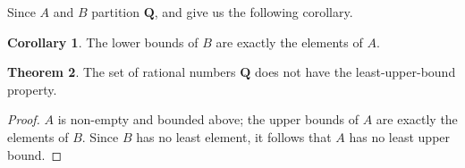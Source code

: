 \documentclass[12pt]{article}
\theoremstyle{definition}
\newtheorem{theorem}{Theorem}
\newtheorem{corollary}[theorem]{Corollary}
\newcommand{\Q}{\mathbf{Q}}
\begin{document}
Since \( A \) and \( B \) partition \( \Q \),  and  give us the following corollary.

\begin{corollary}
    The lower bounds of \( B \) are exactly the elements of \( A \).
\end{corollary}

\begin{theorem}
    The set of rational numbers \( \Q \) does not have the least-upper-bound property.
\end{theorem}

\begin{proof}
    \( A \) is non-empty and bounded above; the upper bounds of \( A \) are exactly the elements of \( B \). Since \( B \) has no least element, it follows that \( A \) has no least upper bound.
\end{proof}
\end{document}
